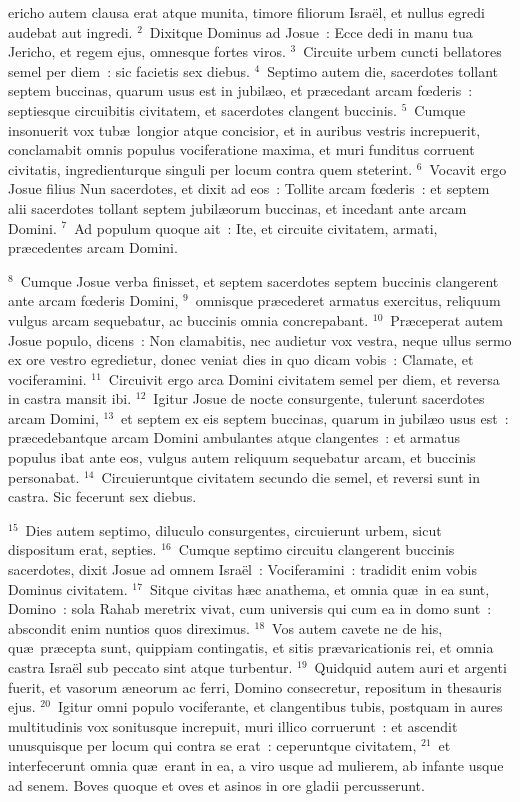 \bchapter
{}ericho autem clausa erat atque munita, timore filiorum Isra\"el, et nullus egredi audebat aut ingredi.
${}^{2}$~Dixitque Dominus ad Josue~: Ecce dedi in manu tua Jericho, et regem ejus, omnesque fortes viros.
${}^{3}$~Circuite urbem cuncti bellatores semel per diem~: sic facietis sex diebus.
${}^{4}$~Septimo autem die, sacerdotes tollant septem buccinas, quarum usus est in jubil\ae o, et pr\ae cedant arcam fœderis~: septiesque circuibitis civitatem, et sacerdotes clangent buccinis.
${}^{5}$~Cumque insonuerit vox tub\ae\ longior atque concisior, et in auribus vestris increpuerit, conclamabit omnis populus vociferatione maxima, et muri funditus corruent civitatis, ingredienturque singuli per locum contra quem steterint.
${}^{6}$~Vocavit ergo Josue filius Nun sacerdotes, et dixit ad eos~: Tollite arcam fœderis~: et septem alii sacerdotes tollant septem jubil\ae orum buccinas, et incedant ante arcam Domini.
${}^{7}$~Ad populum quoque ait~: Ite, et circuite civitatem, armati, pr\ae cedentes arcam Domini.


${}^{8}$~Cumque Josue verba finisset, et septem sacerdotes septem buccinis clangerent ante arcam fœderis Domini,
${}^{9}$~omnisque pr\ae cederet armatus exercitus, reliquum vulgus arcam sequebatur, ac buccinis omnia concrepabant.
${}^{10}$~Pr\ae ceperat autem Josue populo, dicens~: Non clamabitis, nec audietur vox vestra, neque ullus sermo ex ore vestro egredietur, donec veniat dies in quo dicam vobis~: Clamate, et vociferamini.
${}^{11}$~Circuivit ergo arca Domini civitatem semel per diem, et reversa in castra mansit ibi.
${}^{12}$~Igitur Josue de nocte consurgente, tulerunt sacerdotes arcam Domini,
${}^{13}$~et septem ex eis septem buccinas, quarum in jubil\ae o usus est~: pr\ae cedebantque arcam Domini ambulantes atque clangentes~: et armatus populus ibat ante eos, vulgus autem reliquum sequebatur arcam, et buccinis personabat.
${}^{14}$~Circuieruntque civitatem secundo die semel, et reversi sunt in castra. Sic fecerunt sex diebus.


${}^{15}$~Dies autem septimo, diluculo consurgentes, circuierunt urbem, sicut dispositum erat, septies.
${}^{16}$~Cumque septimo circuitu clangerent buccinis sacerdotes, dixit Josue ad omnem Isra\"el~: Vociferamini~: tradidit enim vobis Dominus civitatem.
${}^{17}$~Sitque civitas h\ae c anathema, et omnia qu\ae\ in ea sunt, Domino~: sola Rahab meretrix vivat, cum universis qui cum ea in domo sunt~: abscondit enim nuntios quos direximus.
${}^{18}$~Vos autem cavete ne de his, qu\ae\ pr\ae cepta sunt, quippiam contingatis, et sitis pr\ae varicationis rei, et omnia castra Isra\"el sub peccato sint atque turbentur.
${}^{19}$~Quidquid autem auri et argenti fuerit, et vasorum \ae neorum ac ferri, Domino consecretur, repositum in thesauris ejus.
${}^{20}$~Igitur omni populo vociferante, et clangentibus tubis, postquam in aures multitudinis vox sonitusque increpuit, muri illico corruerunt~: et ascendit unusquisque per locum qui contra se erat~: ceperuntque civitatem,
${}^{21}$~et interfecerunt omnia qu\ae\ erant in ea, a viro usque ad mulierem, ab infante usque ad senem. Boves quoque et oves et asinos in ore gladii percusserunt.


